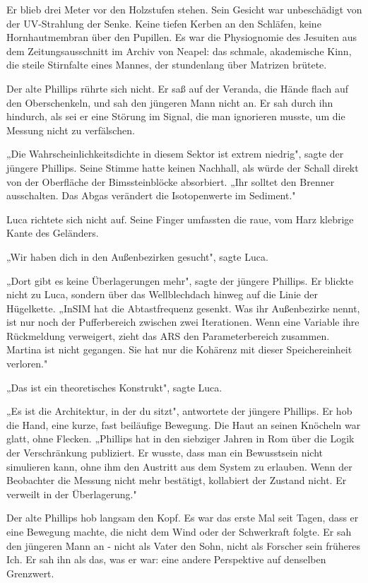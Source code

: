 \documentclass[
  ngerman,
]{article}
\begin{document}
Er blieb drei Meter vor den Holzstufen stehen. Sein Gesicht war
unbeschädigt von der UV-Strahlung der Senke. Keine tiefen Kerben an den
Schläfen, keine Hornhautmembran über den Pupillen. Es war die
Physiognomie des Jesuiten aus dem Zeitungsausschnitt im Archiv von
Neapel: das schmale, akademische Kinn, die steile Stirnfalte eines
Mannes, der stundenlang über Matrizen brütete.

Der alte Phillips rührte sich nicht. Er saß auf der Veranda, die Hände
flach auf den Oberschenkeln, und sah den jüngeren Mann nicht an. Er sah
durch ihn hindurch, als sei er eine Störung im Signal, die man
ignorieren musste, um die Messung nicht zu verfälschen.

„Die Wahrscheinlichkeitsdichte in diesem Sektor ist extrem niedrig",
sagte der jüngere Phillips. Seine Stimme hatte keinen Nachhall, als
würde der Schall direkt von der Oberfläche der Bimssteinblöcke
absorbiert. „Ihr solltet den Brenner ausschalten. Das Abgas verändert
die Isotopenwerte im Sediment."

Luca richtete sich nicht auf. Seine Finger umfassten die raue, vom Harz
klebrige Kante des Geländers.

„Wir haben dich in den Außenbezirken gesucht", sagte Luca.

„Dort gibt es keine Überlagerungen mehr", sagte der jüngere Phillips. Er
blickte nicht zu Luca, sondern über das Wellblechdach hinweg auf die
Linie der Hügelkette. „InSIM hat die Abtastfrequenz gesenkt. Was ihr
Außenbezirke nennt, ist nur noch der Pufferbereich zwischen zwei
Iterationen. Wenn eine Variable ihre Rückmeldung verweigert, zieht das
ARS den Parameterbereich zusammen. Martina ist nicht gegangen. Sie hat
nur die Kohärenz mit dieser Speichereinheit verloren."

„Das ist ein theoretisches Konstrukt", sagte Luca.

„Es ist die Architektur, in der du sitzt", antwortete der jüngere
Phillips. Er hob die Hand, eine kurze, fast beiläufige Bewegung. Die
Haut an seinen Knöcheln war glatt, ohne Flecken. „Phillips hat in den
siebziger Jahren in Rom über die Logik der Verschränkung publiziert. Er
wusste, dass man ein Bewusstsein nicht simulieren kann, ohne ihm den
Austritt aus dem System zu erlauben. Wenn der Beobachter die Messung
nicht mehr bestätigt, kollabiert der Zustand nicht. Er verweilt in der
Überlagerung."

Der alte Phillips hob langsam den Kopf. Es war das erste Mal seit Tagen,
dass er eine Bewegung machte, die nicht dem Wind oder der Schwerkraft
folgte. Er sah den jüngeren Mann an - nicht als Vater den Sohn, nicht
als Forscher sein früheres Ich. Er sah ihn als das, was er war: eine
andere Perspektive auf denselben Grenzwert.
\end{document}
